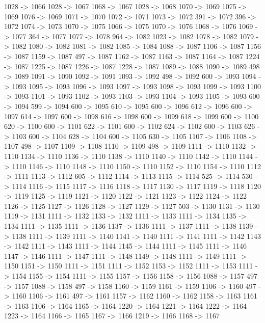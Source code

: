 {	1028 -> 1066
	1028 -> 1067
	1068 -> 1067
	1028 -> 1068
	1070 -> 1069
	1075 -> 1069
	1076 -> 1069
	1071 -> 1070
	1072 -> 1071
	1073 -> 1072
	391 -> 1072
	396 -> 1072
	1074 -> 1073
	1070 -> 1075
	1066 -> 1075
	1070 -> 1076
	1068 -> 1076
	1069 -> 1077
	364 -> 1077
	1077 -> 1078
	964 -> 1082
	1023 -> 1082
	1078 -> 1082
	1079 -> 1082
	1080 -> 1082
	1081 -> 1082
	1085 -> 1084
	1088 -> 1087
	1106 -> 1087
	1156 -> 1087
	1159 -> 1087
	497 -> 1087
	1162 -> 1087
	1163 -> 1087
	1164 -> 1087
	1224 -> 1087
	1225 -> 1087
	1226 -> 1087
	1228 -> 1087
	1089 -> 1088
	1090 -> 1089
	498 -> 1089
	1091 -> 1090
	1092 -> 1091
	1093 -> 1092
	498 -> 1092
	600 -> 1093
	1094 -> 1093
	1095 -> 1093
	1096 -> 1093
	1097 -> 1093
	1098 -> 1093
	1099 -> 1093
	1100 -> 1093
	1101 -> 1093
	1102 -> 1093
	1103 -> 1093
	1104 -> 1093
	1105 -> 1093
	600 -> 1094
	599 -> 1094
	600 -> 1095
	610 -> 1095
	600 -> 1096
	612 -> 1096
	600 -> 1097
	614 -> 1097
	600 -> 1098
	616 -> 1098
	600 -> 1099
	618 -> 1099
	600 -> 1100
	620 -> 1100
	600 -> 1101
	622 -> 1101
	600 -> 1102
	624 -> 1102
	600 -> 1103
	626 -> 1103
	600 -> 1104
	628 -> 1104
	600 -> 1105
	630 -> 1105
	1107 -> 1106
	1108 -> 1107
	498 -> 1107
	1109 -> 1108
	1110 -> 1109
	498 -> 1109
	1111 -> 1110
	1132 -> 1110
	1134 -> 1110
	1136 -> 1110
	1138 -> 1110
	1140 -> 1110
	1142 -> 1110
	1144 -> 1110
	1146 -> 1110
	1148 -> 1110
	1150 -> 1110
	1152 -> 1110
	1154 -> 1110
	1112 -> 1111
	1113 -> 1112
	605 -> 1112
	1114 -> 1113
	1115 -> 1114
	525 -> 1114
	530 -> 1114
	1116 -> 1115
	1117 -> 1116
	1118 -> 1117
	1130 -> 1117
	1119 -> 1118
	1120 -> 1119
	1125 -> 1119
	1121 -> 1120
	1122 -> 1121
	1123 -> 1122
	1124 -> 1122
	1126 -> 1125
	1127 -> 1126
	1128 -> 1127
	1129 -> 1127
	503 -> 1130
	1131 -> 1130
	1119 -> 1131
	1111 -> 1132
	1133 -> 1132
	1111 -> 1133
	1111 -> 1134
	1135 -> 1134
	1111 -> 1135
	1111 -> 1136
	1137 -> 1136
	1111 -> 1137
	1111 -> 1138
	1139 -> 1138
	1111 -> 1139
	1111 -> 1140
	1141 -> 1140
	1111 -> 1141
	1111 -> 1142
	1143 -> 1142
	1111 -> 1143
	1111 -> 1144
	1145 -> 1144
	1111 -> 1145
	1111 -> 1146
	1147 -> 1146
	1111 -> 1147
	1111 -> 1148
	1149 -> 1148
	1111 -> 1149
	1111 -> 1150
	1151 -> 1150
	1111 -> 1151
	1111 -> 1152
	1153 -> 1152
	1111 -> 1153
	1111 -> 1154
	1155 -> 1154
	1111 -> 1155
	1157 -> 1156
	1158 -> 1156
	1088 -> 1157
	497 -> 1157
	1088 -> 1158
	497 -> 1158
	1160 -> 1159
	1161 -> 1159
	1106 -> 1160
	497 -> 1160
	1106 -> 1161
	497 -> 1161
	1157 -> 1162
	1160 -> 1162
	1158 -> 1163
	1161 -> 1163
	1106 -> 1164
	1165 -> 1164
	1220 -> 1164
	1221 -> 1164
	1222 -> 1164
	1223 -> 1164
	1166 -> 1165
	1167 -> 1166
	1219 -> 1166
	1168 -> 1167
}
